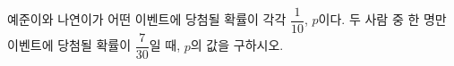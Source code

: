 예준이와 나연이가 어떤 이벤트에 당첨될 확률이 각각 $\dfrac{1}{10}$, $p$이다. 두 사람 중 한 명만 이벤트에 당첨될 확률이 $\dfrac{7}{30}$일 때, $p$의 값을 구하시오. 
